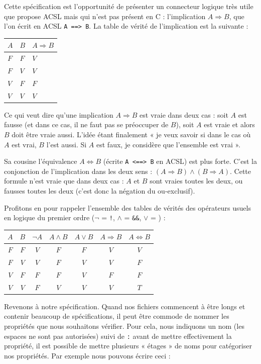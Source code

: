 \documentclass[12pt,francais,]{scrbook}
\newenvironment{zdsblock}[1]{%
  \tcolorbox[beamer,%
    noparskip,breakable,
    colback=LightBlue,colframe=DarkBlue,%
    colbacklower=DarkBlue,%
    title=#1]
}{\endtcolorbox}
\begin{document}
Cette spécification est l'opportunité de présenter un connecteur logique
très utile que propose ACSL mais qui n'est pas présent en C :
l'implication \(A \Rightarrow B\), que l'on écrit en ACSL
\texttt{A\ ==\textgreater{}\ B}. La table de vérité de l'implication est
la suivante :

\begin{longtable}[]{@{}lll@{}}
\toprule
\(A\) & \(B\) & \(A \Rightarrow B\)\tabularnewline
\midrule
\endhead
\(F\) & \(F\) & \(V\)\tabularnewline
\(F\) & \(V\) & \(V\)\tabularnewline
\(V\) & \(F\) & \(F\)\tabularnewline
\(V\) & \(V\) & \(V\)\tabularnewline
\bottomrule
\end{longtable}

Ce qui veut dire qu'une implication \(A \Rightarrow B\) est vraie dans
deux cas : soit \(A\) est fausse (et dans ce cas, il ne faut pas se
préoccuper de \(B\)), soit \(A\) est vraie et alors \(B\) doit être
vraie aussi. L'idée étant finalement « je veux savoir si dans le cas où
\(A\) est vrai, \(B\) l'est aussi. Si \(A\) est faux, je considère que
l'ensemble est vrai ».

Sa cousine l'équivalence \(A \Leftrightarrow B\) (écrite
\texttt{A\ \textless{}==\textgreater{}\ B} en ACSL) est plus forte.
C'est la conjonction de l'implication dans les deux sens :
\((A \Rightarrow B) \wedge (B \Rightarrow A)\). Cette formule n'est
vraie que dans deux cas : \(A\) et \(B\) sont vraies toutes les deux, ou
fausses toutes les deux (c'est donc la négation du ou-exclusif).

\begin{zdsblock}{Information}
  Profitons en pour rappeler l'ensemble des tables de vérités des opérateurs
  usuels en logique du premier ordre (\(\neg\) = \texttt{!},
  \(\wedge\) = \texttt{\&\&}, \(\vee\) = \texttt{\textbar{}\textbar{}}) :
\begin{longtable}[]{@{}ccccccc@{}}
\(A\) & \(B\) & \(\neg A\) & \(A \wedge B\) & \(A \vee B\) & \(A \Rightarrow B\) & \(A \Leftrightarrow B\)\tabularnewline
\midrule
\endhead
\(F\) & \(F\) & \(V\) & \(F\) & \(F\) & \(V\) &\(V\)\tabularnewline
\(F\) & \(V\) & \(V\) & \(F\) & \(V\) & \(V\) &\(F\)\tabularnewline
\(V\) & \(F\) & \(F\) & \(F\) & \(V\) & \(F\) &\(F\)\tabularnewline
\(V\) & \(V\) & \(F\) & \(V\) & \(V\) & \(V\) &\(T\)\tabularnewline
\bottomrule
\end{longtable}
\end{zdsblock}

Revenons à notre spécification. Quand nos fichiers commencent à être
longs et contenir beaucoup de spécifications, il peut être commode de
nommer les propriétés que nous souhaitons vérifier. Pour cela, nous
indiquons un nom (les espaces ne sont pas autorisées) suivi de
\texttt{:} avant de mettre effectivement la propriété, il est possible
de mettre plusieurs « étages » de noms pour catégoriser nos propriétés.
Par exemple nous pouvons écrire ceci :
\end{document}
